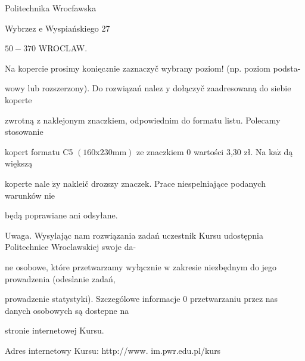\documentclass[a4paper,12pt]{article}
\begin{document}
Politechnika Wrocfawska

Wybrzez $\mathrm{e}$ Wyspiańskiego 27

$50-370$ WROCLAW.

Na kopercie prosimy $\underline{\mathrm{k}\mathrm{o}\mathrm{n}\mathrm{i}\mathrm{e}\mathrm{c}z\mathrm{n}\mathrm{i}\mathrm{e}}$ zaznaczyč wybrany poziom! (np. poziom podsta-

wowy lub rozszerzony). Do rozwiązań nalez $\mathrm{y}$ dołączyč zaadresowaną do siebie koperte

zwrotną $\mathrm{z}$ naklejonym znaczkiem, odpowiednim do formatu listu. Polecamy stosowanie

kopert formatu C5 $(160\mathrm{x}230\mathrm{m}\mathrm{m})$ ze znaczkiem $0$ wartości 3,30 zł. Na $\mathrm{k}\mathrm{a}\dot{\mathrm{z}}$ dą większą

koperte nale $\dot{\mathrm{z}}\mathrm{y}$ nakleič drozszy znaczek. Prace niespelniające podanych warunków nie

będą poprawiane ani odsyłane.

Uwaga. Wysylając nam rozwiązania zadań uczestnik Kursu udostępnia Politechnice Wroclawskiej swoje da-

ne osobowe, które przetwarzamy wyłącznie $\mathrm{w}$ zakresie niezbędnym do jego prowadzenia (odeslanie zadań,

prowadzenie statystyki). Szczególowe informacje $0$ przetwarzaniu przez nas danych osobowych są dostepne na

stronie internetowej Kursu.

Adres internetowy Kursu: http://www. im.pwr.edu.pl/kurs
\end{document}
